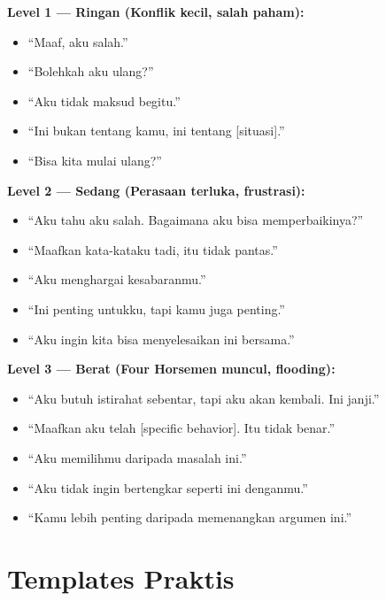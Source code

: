 \begin{praktikbox}
\textbf{Level 1 --- Ringan (Konflik kecil, salah paham):}
\begin{itemize}[itemsep=0.1cm]
    \item[$\square$] ``Maaf, aku salah.''
    \item[$\square$] ``Bolehkah aku ulang?''
    \item[$\square$] ``Aku tidak maksud begitu.''
    \item[$\square$] ``Ini bukan tentang kamu, ini tentang [situasi].''
    \item[$\square$] ``Bisa kita mulai ulang?''
\end{itemize}

\textbf{Level 2 --- Sedang (Perasaan terluka, frustrasi):}
\begin{itemize}[itemsep=0.1cm]
    \item[$\square$] ``Aku tahu aku salah. Bagaimana aku bisa memperbaikinya?''
    \item[$\square$] ``Maafkan kata-kataku tadi, itu tidak pantas.''
    \item[$\square$] ``Aku menghargai kesabaranmu.''
    \item[$\square$] ``Ini penting untukku, tapi kamu juga penting.''
    \item[$\square$] ``Aku ingin kita bisa menyelesaikan ini bersama.''
\end{itemize}

\textbf{Level 3 --- Berat (Four Horsemen muncul, flooding):}
\begin{itemize}[itemsep=0.1cm]
    \item[$\square$] ``Aku butuh istirahat sebentar, tapi aku akan kembali. Ini janji.''
    \item[$\square$] ``Maafkan aku telah [specific behavior]. Itu tidak benar.''
    \item[$\square$] ``Aku memilihmu daripada masalah ini.''
    \item[$\square$] ``Aku tidak ingin bertengkar seperti ini denganmu.''
    \item[$\square$] ``Kamu lebih penting daripada memenangkan argumen ini.''
\end{itemize}
\end{praktikbox}

\section{Templates Praktis}

